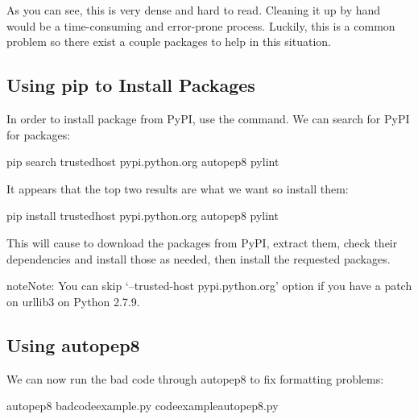 As you can see, this is very dense and hard to read.  Cleaning it up
by hand would be a time-consuming and error-prone process.  Luckily,
this is a common problem so there exist a couple packages to help in
this situation.


\subsection{Using pip to Install Packages}
\label{\detokenize{lesson/prg/python_intro:using-pip-to-install-packages}}
In order to install package from PyPI, use the  command.
We can search for PyPI for packages:

\begin{sphinxVerbatim}[commandchars=\\\{\}]
\PYGZdl{} pip search \PYGZhy{}\PYGZhy{}trusted\PYGZhy{}host pypi.python.org autopep8 pylint
\end{sphinxVerbatim}

It appears that the top two results are what we want so install them:

\begin{sphinxVerbatim}[commandchars=\\\{\}]
\PYGZdl{} pip install \PYGZhy{}\PYGZhy{}trusted\PYGZhy{}host pypi.python.org autopep8 pylint
\end{sphinxVerbatim}

This will cause  to download the packages from PyPI, extract
them, check their dependencies and install those as needed, then
install the requested packages.

\begin{sphinxadmonition}{note}{Note:}
You can skip `--trusted-host pypi.python.org' option if you have a
patch on urllib3 on Python 2.7.9.
\end{sphinxadmonition}


\subsection{Using autopep8}
\label{\detokenize{lesson/prg/python_intro:using-autopep8}}
We can now run the bad code through autopep8 to fix formatting
problems:

\begin{sphinxVerbatim}[commandchars=\\\{\}]
\PYGZdl{} autopep8 bad\PYGZus{}code\PYGZus{}example.py \PYGZgt{}code\PYGZus{}example\PYGZus{}autopep8.py
\end{sphinxVerbatim}

